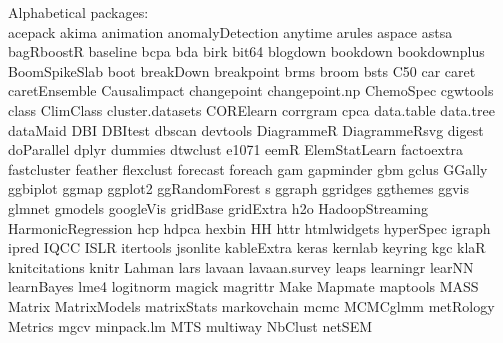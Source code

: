 \documentclass[11pt]{article} %
\begin{document}
\begin{itemize}
        Alphabetical packages:\\
          acepack 
          akima
          animation
          anomalyDetection
          anytime
          arules 
          aspace
          astsa
          bagRboostR 
          baseline  
          bcpa
          bda 
          birk
          bit64
          blogdown
          bookdown
          bookdownplus
          BoomSpikeSlab
          boot 
          breakDown
          breakpoint
          brms  
          broom
          bsts
          C50
          car
          caret 
          caretEnsemble
          Causalimpact
          changepoint
          changepoint.np
          ChemoSpec
          cgwtools
          class
          ClimClass
          cluster.datasets 
          CORElearn 
          corrgram 
          cpca
          data.table
          data.tree 
          dataMaid
          DBI
          DBItest
          dbscan
          devtools 
          DiagrammeR
          DiagrammeRsvg
          digest 
          doParallel
          dplyr 
          dummies
          dtwclust
          e1071
          eemR 
          ElemStatLearn
          factoextra
          fastcluster 
          feather
          flexclust 
          forecast
          foreach
          gam
          gapminder
          gbm 
          gclus 
          GGally 
          ggbiplot   
          ggmap 
          ggplot2
          ggRandomForest s
          ggraph
          ggridges
          ggthemes
          ggvis 
          glmnet 
          gmodels 
          googleVis  
          gridBase 
          gridExtra 
          h2o
          HadoopStreaming  
          HarmonicRegression
          hcp 
          hdpca
          hexbin  
          HH 
          httr 
          htmlwidgets
          hyperSpec 
          igraph 
          ipred 
          IQCC 
          ISLR 
          itertools 
          jsonlite
          kableExtra
          keras
          kernlab 
          keyring
          kgc
          klaR 
          knitcitations 
          knitr 
          Lahman
          lars 
          lavaan 
          lavaan.survey 
          leaps
          learningr
          learNN
          learnBayes
          lme4 
          logitnorm 
          magick
          magrittr 
          Make 
          Mapmate
          maptools
          MASS 
          Matrix 
          MatrixModels 
          matrixStats 
          markovchain
          mcmc
          MCMCglmm
          metRology
          Metrics
          mgcv
          minpack.lm
          MTS
          multiway
          NbClust
          netSEM

\end{itemize}
\end{document}
